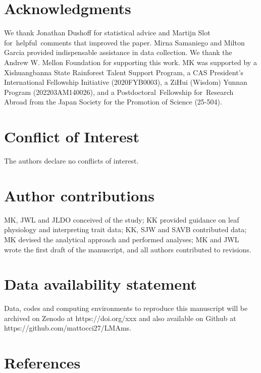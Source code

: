 \documentclass[
  12pt,
  letterpaper,
  DIV=11,
  numbers=noendperiod]{scrartcl}
\begin{document}
\hypertarget{acknowledgments}{%
\section{Acknowledgments}\label{acknowledgments}}

We thank Jonathan Dushoff for statistical advice and Martijn Slot
for~helpful~comments that improved the paper. Mirna Samaniego and Milton
Garcia provided indispensable assistance in data collection. We thank
the Andrew W. Mellon Foundation for supporting this work. MK was
supported by a Xishuangbanna State Rainforest Talent Support Program, a
CAS President's International Fellowship Initiative (2020FYB0003), a
ZiHui (Wisdom) Yunnan Program (202203AM140026), and a
Postdoctoral~Fellowship for~Research Abroad from the Japan Society for
the Promotion of Science (25-504).

\hypertarget{conflict-of-interest}{%
\section{Conflict of Interest}\label{conflict-of-interest}}

The authors declare no conflicts of interest.

\hypertarget{author-contributions}{%
\section{Author contributions}\label{author-contributions}}

MK, JWL and JLDO conceived of the study; KK provided guidance on leaf
physiology and interpreting trait data; KK, SJW and SAVB contributed
data; MK devised the analytical approach and performed analyses; MK and
JWL wrote the first draft of the manuscript, and all authors contributed
to revisions.

\hypertarget{data-availability-statement}{%
\section{Data availability
statement}\label{data-availability-statement}}

Data, codes and computing environments to reproduce this manuscript will
be archived on Zenodo at https://doi.org/xxx and also available on
Github at https://github.com/mattocci27/LMAms.

\hypertarget{references}{%
\section{References}\label{references}}
\end{document}
